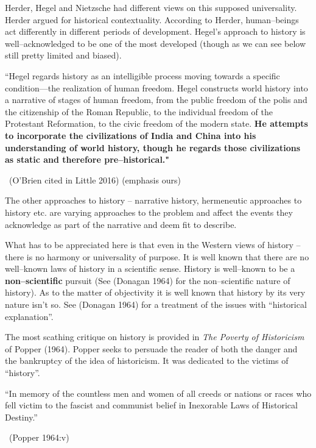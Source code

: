 Herder, Hegel and Nietzsche had different views on this supposed universality. Herder argued for historical contextuality. According to Herder, human–beings act differently in different periods of development. Hegel's approach to history is well–acknowledged to be one of the most developed (though as we can see below still pretty limited and biased).

\begin{myquote}
“Hegel regards history as an intelligible process moving towards a specific condition—the realization of human freedom. Hegel constructs world history into a narrative of stages of human freedom, from the public freedom of the polis and the citizenship of the Roman Republic, to the individual freedom of the Protestant Reformation, to the civic freedom of the modern state. \textbf{He attempts to incorporate the civilizations of India and China into his understanding of world history, though he regards those civilizations as static and therefore pre–historical."} 

~\hfill (O'Brien cited in Little 2016) (emphasis ours)
\end{myquote}

The other approaches to history – narrative history, hermeneutic approaches to history etc. are varying approaches to the problem and affect the events they acknowledge as part of the narrative and deem fit to describe.

What has to be appreciated here is that even in the Western views of history – there is no harmony or universality of purpose. It is well known that there are no well–known laws of history in a scientific sense. History is well–known to be a \textbf{non–scientific} pursuit (See (Donagan 1964) for the non–scientific nature of history). As to the matter of objectivity it is well known that history by its very nature isn’t so. See (Donagan 1964) for a treatment of the issues with “historical explanation”.

The most scathing critique on history is provided in \textit{The Poverty of Historicism} of Popper (1964). Popper seeks to persuade the reader of both the danger and the bankruptcy of the idea of historicism. It was dedicated to the victims of “history”.

\begin{myquote}
“In memory of the countless men and women of all creeds or nations or races who fell victim to the fascist and communist belief in Inexorable Laws of Historical Destiny.”

~\hfill (Popper 1964:v)
\end{myquote}

